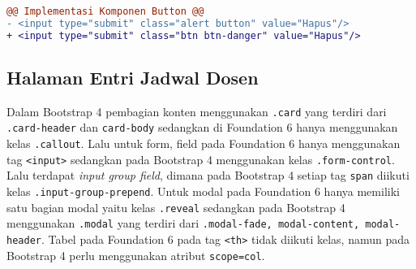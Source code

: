 \begin{lstlisting}[language=diff, caption=Perubahan file \path{\views\PerubahanKuliahManage\main.php}, label=Entri, basicstyle=\ttfamily, frame=single,
columns=fullflexible, keepspaces=true, breaklines=true]
@@ Implementasi Komponen Button @@
- <input type="submit" class="alert button" value="Hapus"/>
+ <input type="submit" class="btn btn-danger" value="Hapus"/>
\end{lstlisting}

\subsection{Halaman Entri Jadwal Dosen}
Dalam Bootstrap 4 pembagian konten menggunakan \texttt{.card} yang terdiri dari \texttt{.card-header} dan \texttt{card-body} sedangkan di Foundation 6 hanya menggunakan kelas \texttt{.callout}. 
Lalu untuk form, field pada Foundation 6 hanya menggunakan tag \texttt{<input>} sedangkan pada Bootstrap 4 menggunakan kelas \texttt{.form-control}.
Lalu terdapat \textit{input group field}, dimana pada Bootstrap 4 setiap tag \texttt{span} diikuti kelas \texttt{.input-group-prepend}.
Untuk modal pada Foundation 6 hanya memiliki satu bagian modal yaitu kelas \texttt{.reveal} sedangkan pada Bootstrap 4 menggunakan \texttt{.modal} yang terdiri dari \texttt{.modal-fade, modal-content, modal-header}.
Tabel pada Foundation 6 pada tag \texttt{<th>} tidak diikuti kelas, namun pada Bootstrap 4 perlu menggunakan atribut \texttt{scope=col}.
